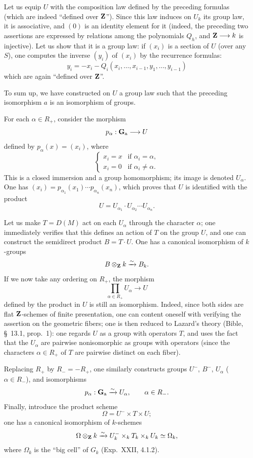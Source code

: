 Let us equip $U$ with the composition law defined by the preceding formulas (which are indeed ``defined over $\mathbf{Z}$''). Since this law induces on $U_k$ its group law, it is associative, and $(0)$ is an identity element for it (indeed, the preceding two assertions are expressed by relations among the polynomials $Q_h$, and $\mathbf{Z}\longrightarrow k$ is injective). Let us show that it is a group law: if $(x_i)$ is a section of $U$ (over any $S$), one computes the inverse $(y_i)$ of $(x_i)$ by the recurrence formulas:
\[
y_i=-x_i-Q_i(x_i,\ldots,x_{i-1},y_1,\ldots,y_{i-1})
\]
which are again ``defined over $\mathbf{Z}$''.

To sum up, we have constructed on $U$ a group law such that the preceding isomorphism $a$ is an isomorphism of groups.

For each $\alpha\in R_+$, consider the morphism
\[
p_\alpha:\mathbf{G}_{\mathrm{a}}\longrightarrow U
\]
defined by $p_\alpha(x)=(x_i)$, where
\[
\begin{cases}
x_i=x&\text{if }\alpha_i=\alpha,\\
x_i=0&\text{if }\alpha_i\ne\alpha.
\end{cases}
\]
This is a closed immersion and a group homomorphism; its image is denoted $U_\alpha$. One has $(x_i)=p_{\alpha_1}(x_1)\cdots p_{\alpha_n}(x_n)$, which proves that $U$ is identified with the product
\[
U=U_{\alpha_1}\cdot U_{\alpha_2}\cdots U_{\alpha_n}.
\]

\label{XXV.2.5}
Let us make $T=D(M)$ act on each $U_\alpha$ through the character $\alpha$; one immediately verifies that this defines an action of $T$ on the group $U$, and one can construct the semidirect product $B=T\cdot U$. One has a canonical isomorphism of $k$-groups
\[
B\otimes_{\mathbf{Z}} k\xrightarrow{\sim} B_k.
\]
If we now take any ordering on $R_+$, the morphism
\[
\prod_{\alpha\in R_+}U_\alpha\to U
\]
defined by the product in $U$ is still an isomorphism. Indeed, since both sides are flat $\mathbf{Z}$-schemes of finite presentation, one can content oneself with verifying the assertion on the geometric fibers; one is then reduced to Lazard's theory (Bible, \S~13.1, prop.~1): one regards $U$ as a group with operators $T$, and uses the fact that the $U_\alpha$ are pairwise nonisomorphic as groups with operators (since the characters $\alpha\in R_+$ of $T$ are pairwise distinct on each fiber).

\label{XXV.2.6}
Replacing $R_+$ by $R_-=-R_+$, one similarly constructs groups $U^-$, $B^-$, $U_\alpha$ ($\alpha\in R_-$), and isomorphisms
\[
p_\alpha:\mathbf{G}_{\mathrm{a}}\xrightarrow{\sim} U_\alpha,\qquad\alpha\in R_-.
\]
Finally, introduce the product scheme
\[
\Omega=U^-\times T\times U;
\]
one has a canonical isomorphism of $k$-schemes
\[
\Omega\otimes_{\mathbf{Z}} k\xrightarrow{\sim} U_k^-\times_k T_k\times_k U_k\simeq\Omega_k,
\]
where $\Omega_k$ is the ``big cell'' of $G_k$ (Exp.~XXII, 4.1.2).

